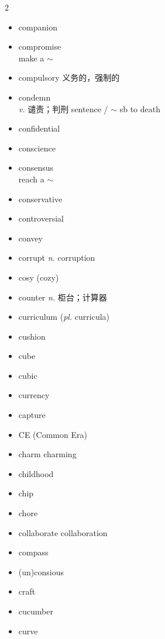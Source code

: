 \documentclass[../../book.tex]{subfiles}
\begin{document}
\begin{multicols}{2}
\begin{itemize}
\\have a good $\sim$ / grasp of
\item[-] companion
\item[-] compromise
\\make a $\sim$
\item[-] compulsory 义务的，强制的
\item[-] condemn
\\\emph{v.} 谴责；判刑 sentence / $\sim$ sb to death
\item[-] confidential
\item[-] conscience
\item[-] consensus
\\reach a $\sim$
\item[-] conservative
\item[-] controversial
\item[-] convey
\item[-] corrupt \phantom{a} \emph{n.} corruption
\item[-] cosy (cozy)
\item[-] counter \emph{n.} 柜台；计算器
\item[-] curriculum (\emph{pl.} curricula)
\item[-] cushion
\item[-] cube
\item[-] cubic
\item[-] currency
\item[-] capture
\item[-] CE (Common Era)
\item[-] charm \phantom{a} charming
\item[-] childhood
\item[-] chip
\item[-] chore
\item[-] collaborate \phantom{a} collaboration
\item[-] compass
\item[-] (un)consious
\item[-] craft
\item[-] cucumber
\item[-] curve
\end{itemize}
\end{multicols}
\end{document}
